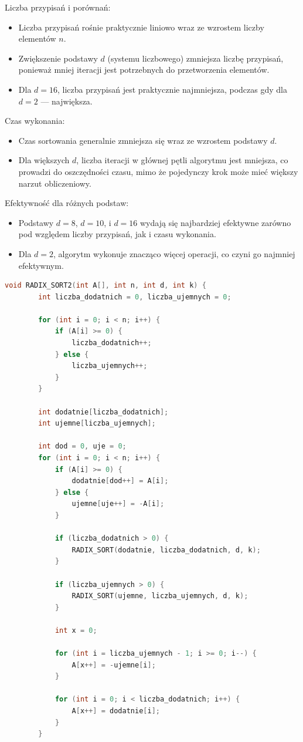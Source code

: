 \documentclass{article}
\begin{document}
		Liczba przypisań i porównań:
		
		\begin{itemize}
			\item Liczba przypisań rośnie praktycznie liniowo wraz ze wzrostem liczby elementów \( n \).
			\item Zwiększenie podstawy \( d \) (systemu liczbowego) zmniejsza liczbę przypisań, ponieważ mniej iteracji jest potrzebnych do przetworzenia elementów.
			\item Dla \( d = 16 \), liczba przypisań jest praktycznie najmniejsza, podczas gdy dla \( d = 2 \) — największa.
		\end{itemize}
		
		Czas wykonania:
		
		\begin{itemize}
			\item Czas sortowania generalnie zmniejsza się wraz ze wzrostem podstawy \( d \).
			\item Dla większych \( d \), liczba iteracji w głównej pętli algorytmu jest mniejsza, co prowadzi do oszczędności czasu, mimo że pojedynczy krok może mieć większy narzut obliczeniowy.
		\end{itemize}
		
		Efektywność dla różnych podstaw:
		
		\begin{itemize}
			\item Podstawy \( d = 8 \), \( d = 10 \), i \( d = 16 \) wydają się najbardziej efektywne zarówno pod względem liczby przypisań, jak i czasu wykonania.
			\item Dla \( d = 2 \), algorytm wykonuje znacząco więcej operacji, co czyni go najmniej efektywnym.
		\end{itemize}
		\begin{lstlisting}[language=C++, tabsize=3]
	void RADIX_SORT2(int A[], int n, int d, int k) {
		int liczba_dodatnich = 0, liczba_ujemnych = 0;
		
		for (int i = 0; i < n; i++) {
			if (A[i] >= 0) {
				liczba_dodatnich++;
			} else {
				liczba_ujemnych++;
			}
		}
		
		int dodatnie[liczba_dodatnich];
		int ujemne[liczba_ujemnych];
		
		int dod = 0, uje = 0;
		for (int i = 0; i < n; i++) {
			if (A[i] >= 0) {
				dodatnie[dod++] = A[i];
			} else {
				ujemne[uje++] = -A[i]; 
			}
			
			if (liczba_dodatnich > 0) {
				RADIX_SORT(dodatnie, liczba_dodatnich, d, k);
			}
			
			if (liczba_ujemnych > 0) {
				RADIX_SORT(ujemne, liczba_ujemnych, d, k);
			}
			
			int x = 0;
			
			for (int i = liczba_ujemnych - 1; i >= 0; i--) {
				A[x++] = -ujemne[i];
			}
			
			for (int i = 0; i < liczba_dodatnich; i++) {
				A[x++] = dodatnie[i];
			}
		}
			\end{lstlisting}
			
\end{document}
